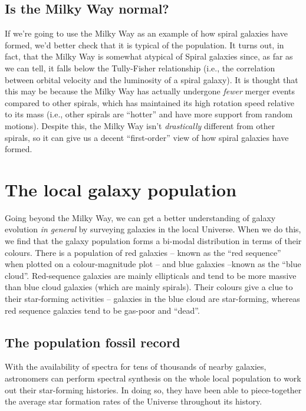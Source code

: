 \documentclass[11pt]{article}
\begin{document}
\subsection{Is the Milky Way normal?}
If we're going to use the Milky Way as an example of how spiral
galaxies have formed, we'd better check that it is typical of the
population. It turns out, in fact, that the Milky Way is somewhat
atypical of Spiral galaxies since, as far as we can tell, it falls
below the Tully-Fisher relationship (i.e., the correlation between
orbital velocity and the luminosity of a spiral galaxy). It is thought
that this may be because the Milky Way has actually undergone {\it
  fewer} merger events compared to other spirals, which has maintained
its high rotation speed relative to its mass (i.e., other spirals are
``hotter'' and have more support from random motions). Despite this,
the Milky Way isn't {\it drastically} different from other spirals, so
it can give us a decent ``first-order'' view of how spiral galaxies
have formed.

\section{The local galaxy population}
Going beyond the Milky Way, we can get a better understanding of
galaxy evolution {\it in general} by surveying galaxies in the local
Universe. When we do this, we find that the galaxy population forms a
bi-modal distribution in terms of their colours. There is a population
of red galaxies -- known as the ``red sequence'' when plotted on a
colour-magnitude plot -- and blue galaxies --known as the ``blue
cloud''. Red-sequence galaxies are mainly ellipticals and tend to be
more massive than blue cloud galaxies (which are mainly
spirals). Their colours give a clue to their star-forming activities
-- galaxies in the blue cloud are star-forming, whereas red sequence
galaxies tend to be gas-poor and ``dead''.

\subsection{The population fossil record}
With the availability of spectra for tens of thousands of nearby
galaxies, astronomers can perform spectral synthesis on the whole
local population to work out their star-forming histories. In doing
so, they have been able to piece-together the average star formation
rates of the Universe throughout its history.
\end{document}
